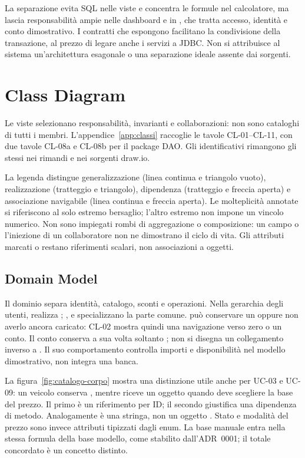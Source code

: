 La separazione evita SQL nelle viste e concentra le formule nel calcolatore,
ma lascia responsabilità ampie nelle dashboard e in ,
che tratta accesso, identità e conto dimostrativo. I contratti che espongono
 facilitano la condivisione della transazione, al prezzo
di legare anche i servizi a JDBC. Non si attribuisce al sistema
un'architettura esagonale o una separazione ideale assente dai sorgenti.

\section{Class Diagram}\label{sec:classi}
Le viste selezionano responsabilità, invarianti e collaborazioni: non sono
cataloghi di tutti i membri. L'appendice~\ref{app:classi} raccoglie le tavole
CL-01--CL-11, con due tavole CL-08a e CL-08b per il package DAO.
Gli identificativi rimangono gli stessi nei rimandi e nei sorgenti draw.io.

La legenda distingue generalizzazione (linea continua e triangolo vuoto),
realizzazione (tratteggio e triangolo), dipendenza (tratteggio e freccia
aperta) e associazione navigabile (linea continua e freccia aperta).
Le molteplicità annotate si riferiscono al solo estremo bersaglio;
l'altro estremo non impone un vincolo numerico. Non sono impiegati rombi
di aggregazione o composizione: un campo o l'iniezione di un collaboratore
non ne dimostrano il ciclo di vita. Gli attributi marcati  o
 restano riferimenti scalari, non associazioni a oggetti.

\subsection{Domain Model}
Il dominio separa identità, catalogo, sconti e operazioni. Nella gerarchia
degli utenti,  realizza ; ,
 e  specializzano la parte comune.
 può conservare un  oppure non averlo ancora
caricato: CL-02 mostra quindi una navigazione verso zero o un conto.
Il conto conserva a sua volta soltanto ; non si disegna
un collegamento inverso a . Il suo comportamento controlla
importi e disponibilità nel modello dimostrativo, non integra una banca.

La figura~\ref{fig:catalogo-corpo} mostra una distinzione utile anche per
UC-03 e UC-09: un veicolo conserva , mentre riceve un oggetto
 quando deve scegliere la base del prezzo. Il primo è un
riferimento per ID; il secondo giustifica una dipendenza di metodo.
Analogamente  è una stringa, non un oggetto .
Stato e modalità del prezzo sono invece attributi tipizzati dagli enum.
La base manuale entra nella stessa formula della base modello, come
stabilito dall'ADR~0001; il totale concordato è un concetto distinto.

